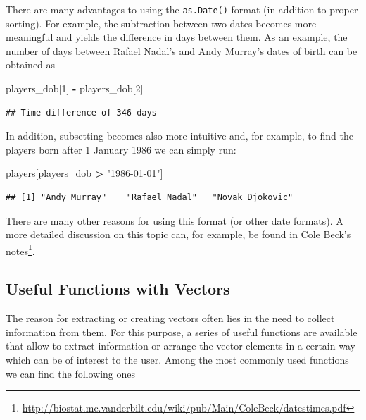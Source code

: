 \documentclass[12pt,]{krantz}
\newenvironment{Shaded}{\begin{snugshade}}{\end{snugshade}}
\newcommand{\DecValTok}[1]{\textcolor[rgb]{0.06,0.06,0.06}{#1}}
\newcommand{\StringTok}[1]{\textcolor[rgb]{0.5,0.5,0.5}{#1}}
\newcommand{\OperatorTok}[1]{\textcolor[rgb]{0.43,0.43,0.43}{\textbf{#1}}}
\newcommand{\NormalTok}[1]{#1}
\renewcommand{\href}[2]{#2\footnote{\url{#1}}}
\begin{document}
There are many advantages to using the \texttt{as.Date()} format (in
addition to proper sorting). For example, the subtraction between two
dates becomes more meaningful and yields the difference in days between
them. As an example, the number of days between Rafael Nadal's and Andy
Murray's dates of birth can be obtained as

\begin{Shaded}
\begin{Highlighting}[]
\NormalTok{players_dob[}\DecValTok{1}\NormalTok{] }\OperatorTok{-}\StringTok{ }\NormalTok{players_dob[}\DecValTok{2}\NormalTok{]}
\end{Highlighting}
\end{Shaded}

\begin{verbatim}
## Time difference of 346 days
\end{verbatim}

In addition, subsetting becomes also more intuitive and, for example, to
find the players born after 1 January 1986 we can simply run:

\begin{Shaded}
\begin{Highlighting}[]
\NormalTok{players[players_dob }\OperatorTok{>}\StringTok{ "1986-01-01"}\NormalTok{]}
\end{Highlighting}
\end{Shaded}

\begin{verbatim}
## [1] "Andy Murray"    "Rafael Nadal"   "Novak Djokovic"
\end{verbatim}

There are many other reasons for using this format (or other date
formats). A more detailed discussion on this topic can, for example, be
found in
\href{http://biostat.mc.vanderbilt.edu/wiki/pub/Main/ColeBeck/datestimes.pdf}{Cole
Beck's notes}.

\subsection{Useful Functions with
Vectors}\label{useful-functions-with-vectors}

The reason for extracting or creating vectors often lies in the need to
collect information from them. For this purpose, a series of useful
functions are available that allow to extract information or arrange the
vector elements in a certain way which can be of interest to the user.
Among the most commonly used functions we can find the following ones
\end{document}
